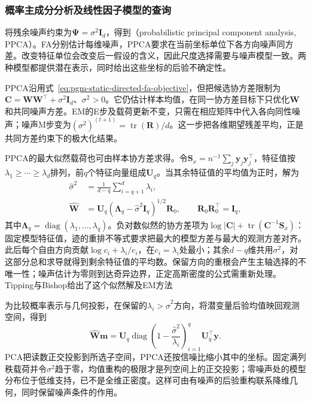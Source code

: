 \subsubsection{概率主成分分析及线性因子模型的查询}
\label{sec:pgm-static-directed-ppca-model}

将残余噪声约束为$\bm\Psi=\sigma^2\bm I_d$，得到（probabilistic principal component analysis, PPCA）。FA分别估计每维噪声，PPCA要求在当前坐标单位下各方向噪声同方差。改变特征单位会改变后一假设的含义，因此尺度选择需要与噪声模型一致。两种模型都提供潜在表示，同时给出这些坐标的后验不确定性。

PPCA沿用式~\eqref{eq:pgm-static-directed-fa-objective}，但把候选协方差限制为$\bm C=\bm W\bm W^\top+\sigma^2\bm I_d$、$\sigma^2>0$。它仍估计样本均值，在同一协方差目标下只优化$\bm W$和共同噪声方差。EM的E步及载荷更新不变，只需在相应矩阵中代入各向同性噪声；噪声M步变为$(\sigma^2)^{(t+1)}=\operatorname{tr}(\bm R)/d$。这一步把各维期望残差平均，正是共同方差约束下的极大化结果。

PPCA的最大似然载荷也可由样本协方差求得。令$\bm S_x=n^{-1}\sum_j\bm y_j\bm y_j^\top$，特征值按$\lambda_1\ge\cdots\ge\lambda_d$排列，前$q$个特征向量组成$\bm U_q$。当其余特征值的平均值为正时，解为
\begin{equation}
  \label{eq:pgm-static-directed-ppca-ml}
  \begin{aligned}
    \widehat{\sigma}^2
      &=\frac{1}{d-q}\sum_{i=q+1}^{d}\lambda_i,\\
    \widehat{\bm{W}}
      &=\bm{U}_q
       (\bm{\Lambda}_q-\widehat{\sigma}^2\bm{I}_q)^{1/2}
       \bm{R}_0,\qquad
       \bm{R}_0\bm{R}_0^\top=\bm{I}_q,
  \end{aligned}
\end{equation}
其中$\bm\Lambda_q=\operatorname{diag}(\lambda_1,\ldots,\lambda_q)$。负对数似然的协方差项为$\log|\bm C|+\operatorname{tr}(\bm C^{-1}\bm S_x)$：固定模型特征值，迹的重排不等式要求把最大的模型方差与最大的观测方差对齐。此后每个自由方向贡献$\log c_i+\lambda_i/c_i$，在$c_i=\lambda_i$处最小；其余$d-q$维共用$\sigma^2$，对这部分总和求导就得到剩余特征值的平均数。保留方向的重根会产生主轴选择的不唯一性；噪声估计为零则到达奇异边界，正定高斯密度的公式需重新处理。Tipping与Bishop给出了这个似然解及EM方法

为比较概率表示与几何投影，在保留的$\lambda_i>\widehat\sigma^2$方向，将潜变量后验均值映回观测空间，得到
\[
  \widehat{\bm{W}}\bm{m}
    =\bm{U}_q\operatorname{diag}
       \left(1-\frac{\widehat{\sigma}^2}{\lambda_i}\right)_{i=1}^{q}
       \bm{U}_q^\top\bm{y}.
\]
PCA把读数正交投影到所选子空间，PPCA还按信噪比缩小其中的坐标。固定满列秩载荷并令$\sigma^2$趋于零，均值重构的极限才是列空间上的正交投影；零噪声处的模型分布位于低维支持，已不是全维正密度。这样可由有噪声的后验重构联系降维几何，同时保留噪声条件的作用。

